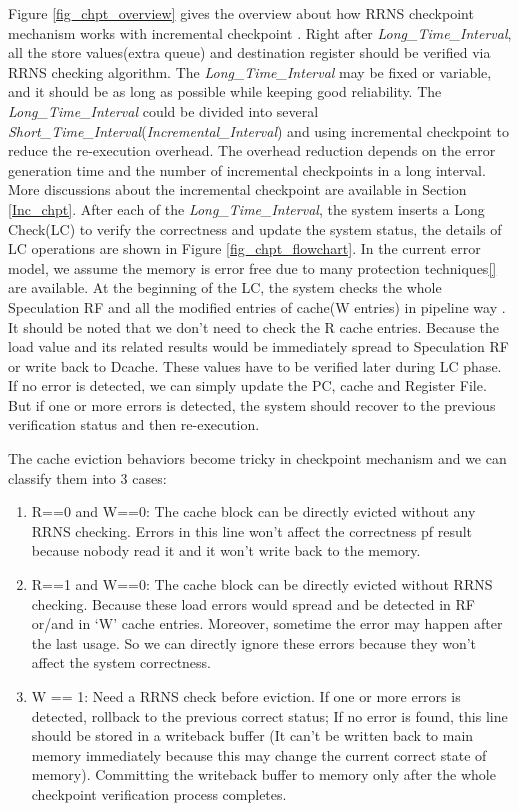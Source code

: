 \documentclass{sig-alternate}
\begin{document}
Figure \ref{fig_chpt_overview} gives the overview about how RRNS checkpoint mechanism works with incremental checkpoint \cite{Naksinehaboon_incchpt, Agarwal_incchpt, Li_incchpt}. 
Right after \textit{Long\_Time\_Interval}, all the store values(extra queue) and destination register should be verified via RRNS checking algorithm. The \textit{Long\_Time\_Interval} may be fixed or variable, and it should be as long as possible while keeping good reliability. The \textit{Long\_Time\_Interval} could be divided into several \textit{Short\_Time\_Interval}(\textit{Incremental\_Interval}) and using incremental checkpoint to reduce the re-execution overhead. The overhead reduction depends on the error generation time and the number of incremental checkpoints in a long interval. More discussions about the incremental checkpoint are available in Section \ref{Inc_chpt}. After each of the \textit{Long\_Time\_Interval}, the system inserts  a Long Check(LC) to verify the correctness and update the system status, the details of LC operations are shown in Figure \ref{fig_chpt_flowchart}. In the current error model, we assume the memory is error free due to many protection techniques\ref{} are available. At the beginning of the LC, the system checks the whole Speculation RF and all the modified entries of cache(W entries) in pipeline way \cite{DengICRC16,DengTACO18} . It should be noted that we don't need to check the R cache entries. Because the load value and its related results would be immediately spread to Speculation RF or write back to Dcache. These values have to be verified later during LC phase. If no error is detected, we can simply update the PC, cache and Register File. But if one or more errors is detected, the system should recover to the previous verification status and then re-execution.  

The cache eviction behaviors become tricky in checkpoint mechanism and we can classify them into 3 cases: 
\begin{enumerate}
\item R==0 and W==0: The cache block can be directly evicted without any RRNS checking. Errors in this line won't affect the correctness pf result because nobody read it and it won't write back to the memory.  
\item R==1 and W==0: The cache block can be directly evicted without RRNS checking. Because these load errors would spread and be detected in RF or/and in `W' cache entries. Moreover, sometime the error may happen after the last usage. So we can directly ignore these errors because they won't affect the system correctness.  
\item W == 1: Need a RRNS check before eviction. If one or more errors is detected, rollback to the previous correct status; If no error is found, this line should be stored in a writeback buffer (It can't be written back to main memory immediately because this may change the current correct state of memory). Committing the writeback buffer to memory only after the whole checkpoint verification process completes.   
\end{enumerate}
\end{document}
